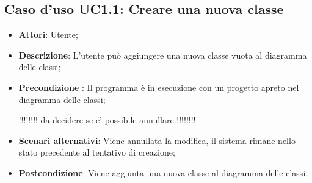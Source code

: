 \documentclass[a4paper]{report}
\begin{document}
\subsection{Caso d'uso UC1.1: Creare una nuova classe}
\begin{itemize}
	\item \textbf{Attori}: Utente;
	
	\item \textbf{Descrizione}: L'utente può aggiungere una nuova classe vuota al diagramma delle classi;
	
	\item \textbf{Precondizione }: Il programma è in esecuzione con un progetto apreto nel diagramma delle classi;
		
	!!!!!!!! da decidere se e' possibile annullare !!!!!!!!
	
	\item \textbf{Scenari alternativi}: Viene annullata la modifica, il sistema
	rimane nello stato precedente al tentativo di creazione;
	
	\item \textbf{Postcondizione}: Viene aggiunta una nuova classe al diagramma delle classi.
\end{itemize}
\end{document}
